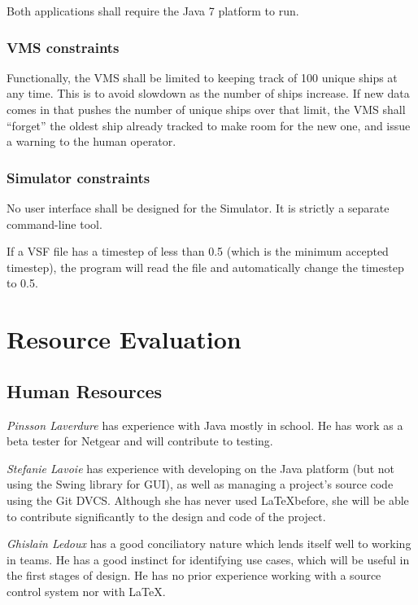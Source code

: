 \documentclass{article}
\begin{document}
Both applications shall require the Java 7 platform to run.

\subsubsection{VMS constraints}
Functionally, the VMS shall be limited to keeping track of 100 unique ships at any time. This is to avoid slowdown as the number of ships increase. If new data comes in that pushes the number of unique ships over that limit, the VMS shall ``forget'' the oldest ship already tracked to make room for the new one, and issue a warning to the human operator.

\subsubsection{Simulator constraints}

No user interface shall be designed for the Simulator. It is strictly a separate command-line tool.

If a VSF file has a timestep of less than 0.5 (which is the minimum accepted timestep), the program will read the file and automatically change the timestep to 0.5.

\section{Resource Evaluation} %

\subsection{Human Resources} %

\emph{Pinsson Laverdure} has experience with Java mostly in school. He has work as a beta tester for Netgear and will contribute to testing.

\emph{Stefanie Lavoie} has experience with developing on the Java platform (but not using the Swing library for GUI), as well as managing a project's source code using the Git DVCS. Although she has never used \LaTeX  before, she will be able to contribute significantly to the design and code of the project.

\emph{Ghislain Ledoux} has a good conciliatory nature which lends itself well to working in teams. He has a good instinct for identifying use cases, which will be useful in the first stages of design. He has no prior experience working with a source control system nor with \LaTeX.
\end{document}
